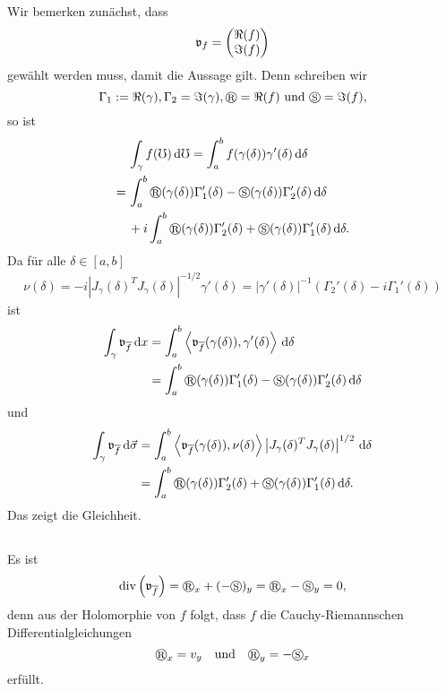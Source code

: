 \documentclass[a4paper,10pt]{article}
\begin{document}
\subsection{}
Wir bemerken zunächst, dass
\[
 \mathfrak{v}_f = \begin{pmatrix}\Re(f) \\ \Im(f)\end{pmatrix}
\]
gewählt werden muss, damit die Aussage gilt. Denn schreiben wir
\[
 \Gamma_1 := \Re(\gamma), \Gamma_2 = \Im(\gamma), \circledR = \Re(f) \text{ und } \circledS = \Im(f),
\]
so ist
\begin{align*}
 &\, \int_\gamma f(\mho) \dd{\mho}
 = \int_a^b f(\gamma(\delta)) \gamma'(\delta) \dd{\delta} \\
 =&\, \int_a^b \circledR(\gamma(\delta))\Gamma_1'(\delta) - \circledS(\gamma(\delta))\Gamma_2'(\delta) \dd{\delta} \\
  &\, + i \int_a^b \circledR(\gamma(\delta)) \Gamma_2'(\delta) + \circledS(\gamma(\delta)) \Gamma_1'(\delta) \dd{\delta}.
\end{align*}
Da für alle $\delta \in [a,b]$
\begin{align*}
 \nu(\delta) = -i\left|J_\gamma(\delta)^T J_\gamma(\delta)\right|^{-1/2} \gamma'(\delta) = |\gamma'(\delta)|^{-1} \left(\Gamma_2'(\delta) - i\Gamma_1'(\delta)\right)
\end{align*}
ist
\begin{align*}
 \int_\gamma \mf{v}_{\overline{f}} \dd{x}
 &= \int_a^b \scal{\mf{v}_{\overline{f}}(\gamma(\delta)), \gamma'(\delta)} \dd{\delta} \\
 &= \int_a^b \circledR(\gamma(\delta))\Gamma_1'(\delta) - \circledS(\gamma(\delta))\Gamma_2'(\delta) \dd{\delta}
\end{align*}
und
\begin{align*}
 \int_\gamma \mf{v}_{\overline{f}} \dd{\vec{\sigma}}
 &= \int_a^b \scal{\mf{v}_{\overline{f}}(\gamma(\delta)), \nu(\delta)} \left|J_\gamma(\delta)^T J_\gamma(\delta)\right|^{1/2} \dd{\delta} \\
 &= \int_a^b \circledR(\gamma(\delta))\Gamma_2'(\delta) + \circledS(\gamma(\delta))\Gamma_1'(\delta) \dd{\delta}.
\end{align*}
Das zeigt die Gleichheit.


\subsection{}
Es ist
\[
 \diver\left( \mf{v}_{\overline{f}} \right)
 = \circledR_x + (-\circledS)_y
 = \circledR_x - \circledS_y
 = 0,
\]
denn aus der Holomorphie von $f$ folgt, dass $f$ die Cauchy-Riemannschen Differentialgleichungen
\[
 \circledR_x = v_y \quad \text{und} \quad \circledR_y = -\circledS_x
\]
erfüllt.
\end{document}
